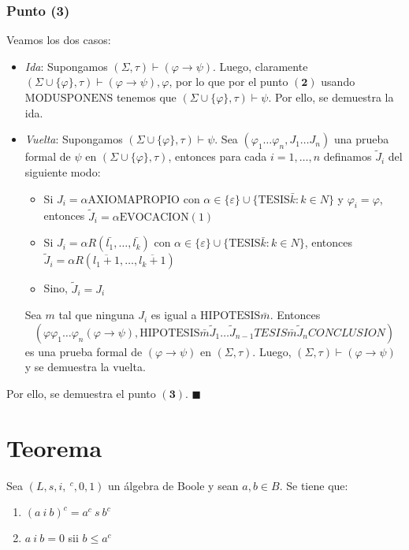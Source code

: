 \documentclass{article}
\begin{document}
\subsubsection*{Punto (3)}
Veamos los dos casos:
\begin{itemize}
  \item \textit{Ida}: Supongamos $(\Sigma,\tau)\vdash(\varphi\to\psi)$. Luego, claramente $(\Sigma\cup\{\varphi\},\tau)\vdash(\varphi\to\psi),\varphi$, por lo que por el punto $\mathbf{(2)}$ usando $\text{MODUSPONENS}$ tenemos que $(\Sigma\cup\{\varphi\},\tau)\vdash\psi$. Por ello, se demuestra la ida.
  \item \textit{Vuelta}: Supongamos $(\Sigma\cup\{\varphi\},\tau)\vdash\psi$. Sea $(\varphi_1\dots\varphi_n,J_1\dots J_n)$ una prueba formal de $\psi$ en $(\Sigma\cup\{\varphi\},\tau)$, entonces para cada $i=1,\dots,n$ definamos $\tilde{J}_i$ del siguiente modo:
        \begin{itemize}
          \item Si $J_i=\alpha\text{AXIOMAPROPIO}$ con $\alpha\in\{\varepsilon\}\cup\{\text{TESIS}\bar{k}:k\in N\}$ y $\varphi_i=\varphi$, entonces $\tilde{J}_i=\alpha\text{EVOCACION}(1)$
          \item Si $J_i=\alpha R(\bar{l_1},\dots,\bar{l_k})$ con $\alpha\in\{\varepsilon\}\cup\{\text{TESIS}\bar{k}:k\in N\}$, entonces $\tilde{J}_i=\alpha R(\overline{l_1+1},\dots,\overline{l_k+1})$
          \item Sino, $\tilde{J}_i=J_i$
        \end{itemize}
        Sea $m$ tal que ninguna $J_i$ es igual a $\text{HIPOTESIS}\bar{m}$. Entonces
        \begin{equation*}
          (\varphi\varphi_1\dots\varphi_n(\varphi\to\psi),\text{HIPOTESIS}\bar{m}\tilde{J}_1\dots\tilde{J}_{n-1}TESIS\bar{m}\tilde{J}_nCONCLUSION)
        \end{equation*}
        es una prueba formal de $(\varphi\to\psi)$ en $(\Sigma,\tau)$. Luego, $(\Sigma,\tau)\vdash(\varphi\to\psi)$ y se demuestra la vuelta.
\end{itemize}

Por ello, se demuestra el punto $\mathbf{(3)}$. $\blacksquare$

\section*{Teorema}
Sea $(L,s,i,\ ^c,0,1)$ un álgebra de Boole y sean $a,b\in B$. Se tiene que:
\begin{enumerate}
  \item $(a\ i\ b)^c=a^c\ s\ b^c$
  \item $a\ i\ b=0$ sii $b\leq a^c$
\end{enumerate}
\end{document}
